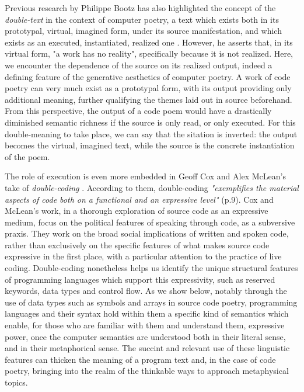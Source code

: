 Previous research by Philippe Bootz has also highlighted the concept of the \emph{double-text} in the context of computer poetry, a text which exists both in its prototypal, virtual, imagined form, under its source manifestation, and which exists as an executed, instantiated, realized one \citep{bootz_problem_2005}. However, he asserts that, in its virtual form, "a work has no reality", specifically because it is not realized. Here, we encounter the dependence of the source on its realized output, indeed a defining feature of the generative aesthetics of computer poetry. A work of code poetry can very much exist as a prototypal form, with its output providing only additional meaning, further qualifying the themes laid out in source beforehand. From this perspective, the output of a code poem would have a drastically diminished semantic richness if the source is only read, or only executed. For this double-meaning to take place, we can say that the sitation is inverted: the output becomes the virtual, imagined text, while the source is the concrete instantiation of the poem.

The role of execution is even more embedded in Geoff Cox and Alex McLean's take of \emph{double-coding} \citep{cox_speaking_2013}. According to them, double-coding \emph{"exemplifies the material aspects of code both on a functional and an expressive level"} (p.9). Cox and McLean's work, in a thorough exploration of source code as an expressive medium, focus on the political features of speaking through code, as a subversive praxis. They work on the broad social implications of written and spoken code, rather than exclusively on the specific features of what makes source code expressive in the first place, with a particular attention to the practice of live coding. Double-coding nonetheless helps us identify the unique structural features of programming languages which support this expressivity, such as reserved keywords, data types and control flow. As we show below, notably through the use of data types such as symbols and arrays in source code poetry, programming languages and their syntax hold within them a specific kind of semantics which enable, for those who are familiar with them and understand them, expressive power, once the computer semantics are understood both in their literal sense, and in their metaphorical sense. The succint and relevant use of these linguistic features can thicken the meaning of a program text and, in the case of code poetry, bringing into the realm of the thinkable ways to approach metaphysical topics.


